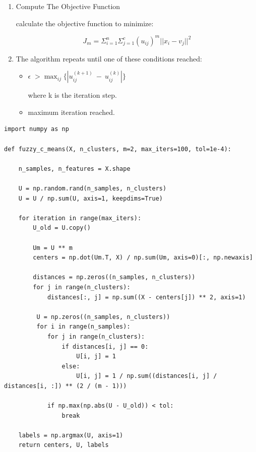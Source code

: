 \documentclass[10pt]{beamer}
\begin{document}
\begin{frame}{}
	\begin{latin}
		\begin{enumerate}
			\item[\lr{4.}]{Compute The Objective Function}

\begin{footnotesize}
	calculate the objective function to minimize: 
\end{footnotesize}
\[
	J_m=\Sigma_{i=1}^{n} \Sigma_{j=1}^{c}(u_{ij})^m ||x_i-v_j||^2
\]

\item[\lr{5.}]The algorithm repeats until one of these conditions reached:

\begin{itemize}
	\item 
	$ \epsilon \; > \max_{ij}\{|u_{ij}^{(k+1)} \: - \: u_{ij}^{(k)} |\}$
	\begin{scriptsize}
		where k is the iteration step.
	\end{scriptsize}
	
	\item 
	maximum iteration reached.
\end{itemize}
		\end{enumerate}
	\end{latin}

\vfill
\vfill
\end{frame}

\begin{frame}[fragile]{}


\begin{verbatim}
import numpy as np

def fuzzy_c_means(X, n_clusters, m=2, max_iters=100, tol=1e-4):

    n_samples, n_features = X.shape

    U = np.random.rand(n_samples, n_clusters)
    U = U / np.sum(U, axis=1, keepdims=True)

    for iteration in range(max_iters):
        U_old = U.copy()

        Um = U ** m
        centers = np.dot(Um.T, X) / np.sum(Um, axis=0)[:, np.newaxis]

        distances = np.zeros((n_samples, n_clusters))
        for j in range(n_clusters):
            distances[:, j] = np.sum((X - centers[j]) ** 2, axis=1)

         U = np.zeros((n_samples, n_clusters))
         for i in range(n_samples):
            for j in range(n_clusters):
                if distances[i, j] == 0:
                    U[i, j] = 1
                else:
                    U[i, j] = 1 / np.sum((distances[i, j] / distances[i, :]) ** (2 / (m - 1)))

            if np.max(np.abs(U - U_old)) < tol:
                break

    labels = np.argmax(U, axis=1)
    return centers, U, labels
\end{verbatim}
\end{frame}
	
\end{document}
